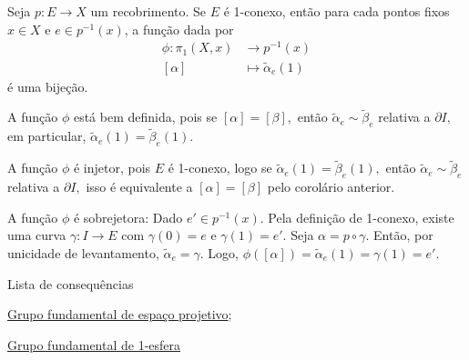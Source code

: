 \begin{corol}\label{cor:bijedeggene}
    Seja $p:E\rightarrow X$ um recobrimento. Se $E$ é 1-conexo, então para cada pontos fixos $x\in X$ e $e\in p^{-1}(x)$, a função dada por 
    \begin{align*}
        \phi:\pi_1(X,x)&\longrightarrow p^{-1}(x)\\
        [\alpha]&\longmapsto \tilde{\alpha}_{e}(1)
    \end{align*}
    é uma bijeção.
\end{corol}

\begin{dem}
    A função $\phi$ está bem definida, pois se $[\alpha]=[\beta],$ então $\tilde{\alpha}_{e}\sim \tilde{\beta}_{e}$ relativa a $\partial I,$ em particular, $\tilde{\alpha}_e(1)=\tilde{\beta}_e(1).$
    
    A função $\phi$ é injetor, pois $E$ é 1-conexo, logo se $\tilde{\alpha}_e(1)=\tilde{\beta}_e(1),$ então $\tilde{\alpha}_e \sim \tilde{\beta}_e$ relativa a $\partial I,$ isso é equivalente a $[\alpha]=[\beta]$ pelo corolário anterior.

    A função $\phi$ é sobrejetora: Dado $e'\in p^{-1}(x).$ Pela definição de 1-conexo, existe uma curva $\gamma:I\rightarrow E$ com $\gamma(0)=e$ e $\gamma(1)=e'.$ Seja $\alpha=p\circ \gamma.$ Então, por unicidade de levantamento, $\tilde{\alpha}_e=\gamma.$ Logo, $\phi([\alpha])=\tilde{\alpha}_e(1)=\gamma(1)=e'.$ 
\end{dem}

\begin{titlemize}{Lista de consequências}
	\item \hyperref[grupo-fundamental-de-espaco-projetivo-ex]{Grupo fundamental de espaço projetivo};\\ %
	\item \hyperref[grupo-fundamental-de-S1-prop]{Grupo fundamental de 1-esfera}
\end{titlemize}
